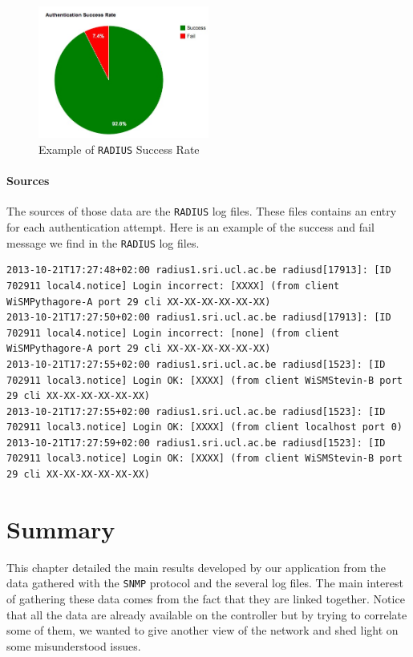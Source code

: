\begin{figure}[H]
	\centering
   \includegraphics[width=0.5\textwidth]{Pictures/chapter5/radiusRate.jpg}
   \caption{Example of \texttt{RADIUS} Success Rate}
\end{figure} 

\paragraph*{Sources} The sources of those data are the \texttt{RADIUS} log files. These files contains an entry for each authentication attempt. Here is an example of the success and fail message we find in the \texttt{RADIUS} log files.
\begin{lstlisting}[frame=single,breaklines=true,caption={\texttt{RADIUS} logs}]
2013-10-21T17:27:48+02:00 radius1.sri.ucl.ac.be radiusd[17913]: [ID 702911 local4.notice] Login incorrect: [XXXX] (from client WiSMPythagore-A port 29 cli XX-XX-XX-XX-XX-XX)
2013-10-21T17:27:50+02:00 radius1.sri.ucl.ac.be radiusd[17913]: [ID 702911 local4.notice] Login incorrect: [none] (from client WiSMPythagore-A port 29 cli XX-XX-XX-XX-XX-XX)
2013-10-21T17:27:55+02:00 radius1.sri.ucl.ac.be radiusd[1523]: [ID 702911 local3.notice] Login OK: [XXXX] (from client WiSMStevin-B port 29 cli XX-XX-XX-XX-XX-XX)
2013-10-21T17:27:55+02:00 radius1.sri.ucl.ac.be radiusd[1523]: [ID 702911 local3.notice] Login OK: [XXXX] (from client localhost port 0)
2013-10-21T17:27:59+02:00 radius1.sri.ucl.ac.be radiusd[1523]: [ID 702911 local3.notice] Login OK: [XXXX] (from client WiSMStevin-B port 29 cli XX-XX-XX-XX-XX-XX)
\end{lstlisting}

\section{Summary}
This chapter detailed the main results developed by our application from the data gathered with the \texttt{SNMP} protocol and the several log files. The main interest of gathering these data comes from the fact that they are linked together. Notice that all the data are already available on the controller but by trying to correlate some of them, we wanted to give another view of the network and shed light on some misunderstood issues. 

